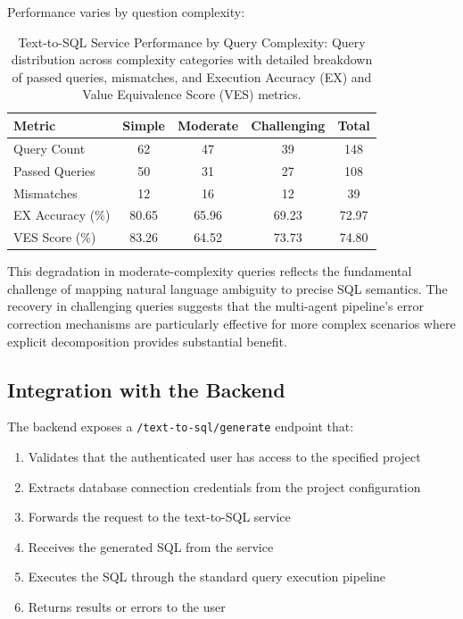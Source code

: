Performance varies by question complexity:

\begin{table}[h]
    \centering
    \begin{tabular}{lcccc}
        \toprule
        \textbf{Metric} & \textbf{Simple} & \textbf{Moderate} & \textbf{Challenging} & \textbf{Total} \\
        \midrule
        Query Count      & 62       & 47        & 39        & 148  \\
        Passed Queries   & 50       & 31        & 27        & 108  \\
        Mismatches       & 12       & 16        & 12        & 39   \\
        EX Accuracy (\%) & 80.65    & 65.96     & 69.23     & 72.97 \\
        VES Score (\%)   & 83.26    & 64.52     & 73.73     & 74.80 \\
        \bottomrule
    \end{tabular}
    \caption{Text-to-SQL Service Performance by Query Complexity: Query distribution across complexity categories with detailed breakdown of passed queries, mismatches, and Execution Accuracy (EX) and Value Equivalence Score (VES) metrics.}
    \label{tab:text_to_sql_performance}
\end{table}

This degradation in moderate-complexity queries reflects the fundamental challenge of mapping natural language ambiguity to precise SQL semantics. The recovery in challenging queries suggests that the multi-agent pipeline's error correction mechanisms are particularly effective for more complex scenarios where explicit decomposition provides substantial benefit.

\subsection{Integration with the Backend}

The backend exposes a \texttt{/text-to-sql/generate} endpoint that:

\begin{enumerate}
    \item Validates that the authenticated user has access to the specified project
    \item Extracts database connection credentials from the project configuration
    \item Forwards the request to the text-to-SQL service
    \item Receives the generated SQL from the service
    \item Executes the SQL through the standard query execution pipeline
    \item Returns results or errors to the user
\end{enumerate}

